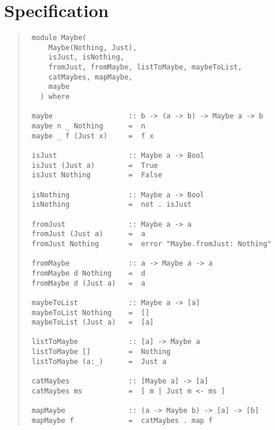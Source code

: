 \section{Specification
}
\begin{quote}
{\haddockverb\begin{verbatim}
 module Maybe(
     Maybe(Nothing, Just),
     isJust, isNothing,
     fromJust, fromMaybe, listToMaybe, maybeToList,
     catMaybes, mapMaybe,
     maybe
   ) where
 
 maybe                  :: b -> (a -> b) -> Maybe a -> b
 maybe n _ Nothing      =  n
 maybe _ f (Just x)     =  f x
 
 isJust                 :: Maybe a -> Bool
 isJust (Just a)        =  True
 isJust Nothing         =  False
 
 isNothing              :: Maybe a -> Bool
 isNothing              =  not . isJust
 
 fromJust               :: Maybe a -> a
 fromJust (Just a)      =  a
 fromJust Nothing       =  error "Maybe.fromJust: Nothing"
 
 fromMaybe              :: a -> Maybe a -> a
 fromMaybe d Nothing    =  d
 fromMaybe d (Just a)   =  a
 
 maybeToList            :: Maybe a -> [a]
 maybeToList Nothing    =  []
 maybeToList (Just a)   =  [a]
 
 listToMaybe            :: [a] -> Maybe a
 listToMaybe []         =  Nothing
 listToMaybe (a:_)      =  Just a
  
 catMaybes              :: [Maybe a] -> [a]
 catMaybes ms           =  [ m | Just m <- ms ]
 
 mapMaybe               :: (a -> Maybe b) -> [a] -> [b]
 mapMaybe f             =  catMaybes . map f
\end{verbatim}}
\end{quote}
